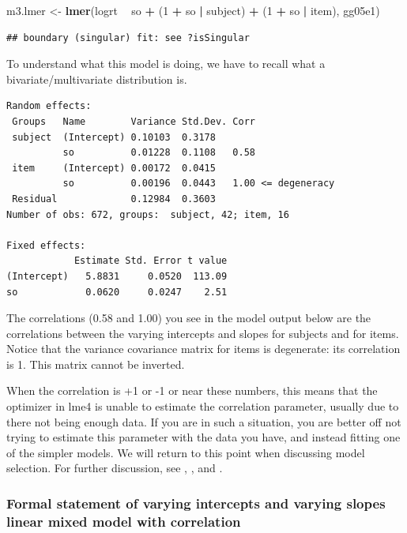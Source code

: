 \documentclass[12pt,]{krantz}
\newenvironment{Shaded}{\begin{snugshade}}{\end{snugshade}}
\newcommand{\DecValTok}[1]{\textcolor[rgb]{0.00,0.00,0.81}{#1}}
\newcommand{\KeywordTok}[1]{\textcolor[rgb]{0.13,0.29,0.53}{\textbf{#1}}}
\newcommand{\NormalTok}[1]{#1}
\newcommand{\OperatorTok}[1]{\textcolor[rgb]{0.81,0.36,0.00}{\textbf{#1}}}
\newcommand{\StringTok}[1]{\textcolor[rgb]{0.31,0.60,0.02}{#1}}
\begin{document}
\begin{Shaded}
\begin{Highlighting}[]
\NormalTok{m3.lmer <-}\StringTok{ }\KeywordTok{lmer}\NormalTok{(logrt }\OperatorTok{~}\StringTok{ }\NormalTok{so }\OperatorTok{+}\StringTok{ }\NormalTok{(}\DecValTok{1} \OperatorTok{+}\StringTok{ }\NormalTok{so }\OperatorTok{|}\StringTok{ }\NormalTok{subject) }\OperatorTok{+}\StringTok{ }
\StringTok{  }\NormalTok{(}\DecValTok{1} \OperatorTok{+}\StringTok{ }\NormalTok{so }\OperatorTok{|}\StringTok{ }\NormalTok{item), gg05e1)}
\end{Highlighting}
\end{Shaded}

\begin{verbatim}
## boundary (singular) fit: see ?isSingular
\end{verbatim}

To understand what this model is doing, we have to recall what a bivariate/multivariate distribution is.

\begin{verbatim}
Random effects:
 Groups   Name        Variance Std.Dev. Corr
 subject  (Intercept) 0.10103  0.3178       
          so          0.01228  0.1108   0.58
 item     (Intercept) 0.00172  0.0415       
          so          0.00196  0.0443   1.00 <= degeneracy
 Residual             0.12984  0.3603       
Number of obs: 672, groups:  subject, 42; item, 16

Fixed effects:
            Estimate Std. Error t value
(Intercept)   5.8831     0.0520  113.09
so            0.0620     0.0247    2.51
\end{verbatim}

The correlations (0.58 and 1.00) you see in the model output below are the correlations between the varying intercepts and slopes for subjects and for items. Notice that the variance covariance matrix for items is degenerate: its correlation is 1. This matrix cannot be inverted.

When the correlation is +1 or -1 or near these numbers, this means that the optimizer in lme4 is unable to estimate the correlation parameter, usually due to there not being enough data. If you are in such a situation, you are better off not trying to estimate this parameter with the data you have, and instead fitting one of the simpler models. We will return to this point when discussing model selection. For further discussion, see \citet{barr2013}, \citet{BatesEtAlParsimonious}, and \citet{hannesBEAP}.

\hypertarget{formal-statement-of-varying-intercepts-and-varying-slopes-linear-mixed-model-with-correlation}{%
\subsubsection{Formal statement of varying intercepts and varying slopes linear mixed model with correlation}\label{formal-statement-of-varying-intercepts-and-varying-slopes-linear-mixed-model-with-correlation}}
\end{document}
